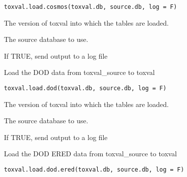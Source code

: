 \documentclass[letterpaper]{book}
\begin{document}
%
\begin{Usage}
\begin{verbatim}
toxval.load.cosmos(toxval.db, source.db, log = F)
\end{verbatim}
\end{Usage}
%
\begin{Arguments}
\begin{ldescription}
\item[\code{toxval.db}] The version of toxval into which the tables are loaded.

\item[\code{source.db}] The source database to use.

\item[\code{log}] If TRUE, send output to a log file
\end{ldescription}
\end{Arguments}
%
\begin{Description}\relax
Load the DOD data from toxval\_source to toxval
\end{Description}
%
\begin{Usage}
\begin{verbatim}
toxval.load.dod(toxval.db, source.db, log = F)
\end{verbatim}
\end{Usage}
%
\begin{Arguments}
\begin{ldescription}
\item[\code{toxval.db}] The version of toxval into which the tables are loaded.

\item[\code{source.db}] The source database to use.

\item[\code{log}] If TRUE, send output to a log file
\end{ldescription}
\end{Arguments}
%
\begin{Description}\relax
Load the DOD ERED data from toxval\_source to toxval
\end{Description}
%
\begin{Usage}
\begin{verbatim}
toxval.load.dod.ered(toxval.db, source.db, log = F)
\end{verbatim}
\end{Usage}
\end{document}
